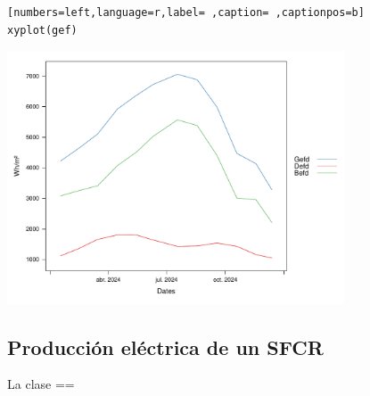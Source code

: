 \begin{lstlisting}[numbers=left,language=r,label= ,caption= ,captionpos=b]
xyplot(gef)
\end{lstlisting}
\begin{center}
\includegraphics[keepaspectratio,width=0.75\textwidth,height=0.5\textheight]{figuras/codigo-gef.pdf}
\end{center}

\subsection{Producción eléctrica de un SFCR}
\label{sec:org86a77bd}
La clase ==
